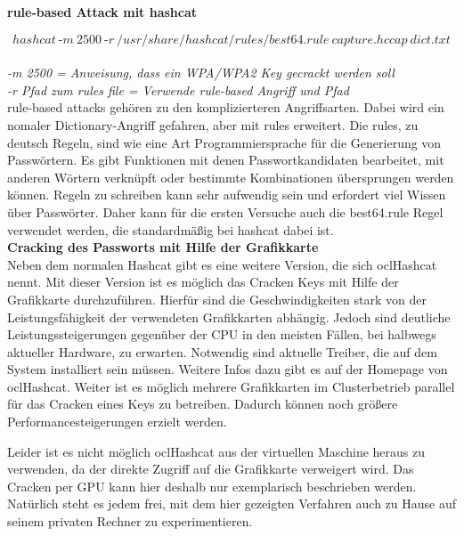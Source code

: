 \textbf{rule-based Attack mit hashcat}

$$hashcat~\text{-}m~2500~\text{-}r~/usr/share/hashcat/rules/best64.rule~capture.hccap~ dict.txt$$\\

\textit{-m 2500 = Anweisung, dass ein WPA/WPA2 Key gecrackt werden soll}\\
\textit{-r Pfad zum rules file = Verwende rule-based Angriff und Pfad}\\

rule-based attacks gehören zu den komplizierteren Angriffsarten. Dabei wird ein nomaler Dictionary-Angriff gefahren, aber mit rules erweitert. 
Die rules, zu deutsch Regeln, sind wie eine Art Programmiersprache
für die Generierung von Passwörtern. Es gibt Funktionen mit denen Passwortkandidaten bearbeitet, mit anderen Wörtern verknüpft oder bestimmte Kombinationen 
übersprungen werden können. Regeln zu schreiben kann sehr aufwendig sein und erfordert viel Wissen über Passwörter. Daher kann für die ersten Versuche auch 
die best64.rule Regel verwendet werden, die standardmäßig bei hashcat dabei ist.\\






\textbf{Cracking des Passworts mit Hilfe der Grafikkarte}\\

Neben dem normalen Hashcat gibt es eine weitere Version, die sich oclHashcat nennt. Mit dieser Version ist es möglich das Cracken Keys mit Hilfe der Grafikkarte durchzuführen. Hierfür sind die Geschwindigkeiten stark von der Leistungsfähigkeit der verwendeten Grafikkarten abhängig. 
Jedoch sind deutliche Leistungssteigerungen gegenüber der CPU in den meisten Fällen, bei halbwegs aktueller Hardware, zu erwarten. Notwendig sind aktuelle Treiber, die auf dem System installiert sein müssen. Weitere Infos dazu gibt es auf der Homepage von oclHashcat. 
Weiter ist es möglich mehrere Grafikkarten im Clusterbetrieb parallel für das Cracken eines Keys zu betreiben. Dadurch können noch größere Performancesteigerungen erzielt werden.

Leider ist es nicht möglich oclHashcat aus der virtuellen Maschine heraus zu verwenden, da der direkte Zugriff auf die Grafikkarte verweigert wird. Das Cracken per GPU kann hier deshalb nur exemplarisch beschrieben werden. Natürlich steht es jedem frei, mit dem hier gezeigten Verfahren auch zu Hause auf seinem privaten Rechner zu experimentieren.\\

